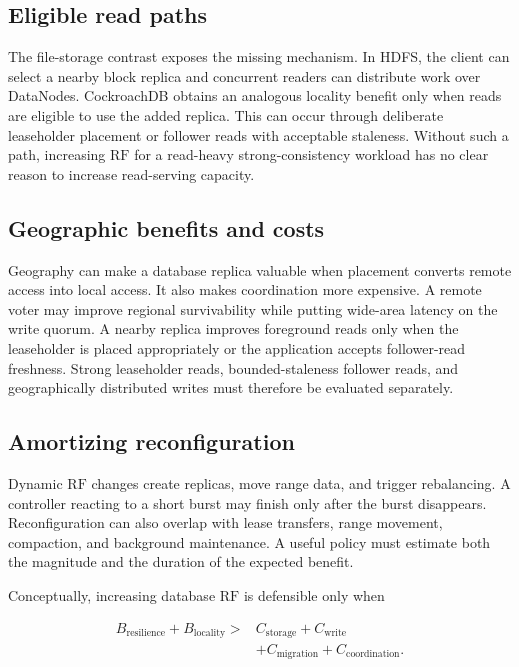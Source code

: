 \documentclass[a4paper,10pt,twocolumn]{article}
\newcommand{\rf}{\ensuremath{\mathrm{RF}}}
\newcommand{\cockroach}{CockroachDB}
\newcommand{\hdfs}{HDFS}
\begin{document}
\subsection{Eligible read paths}

The file-storage contrast exposes the missing mechanism. In \hdfs{}, the
client can select a nearby block replica and concurrent readers can distribute
work over DataNodes. \cockroach{} obtains an analogous locality benefit only
when reads are eligible to use the added replica. This can occur through
deliberate leaseholder placement or follower reads with acceptable staleness.
Without such a path, increasing \rf{} for a read-heavy strong-consistency
workload has no clear reason to increase read-serving capacity.

\subsection{Geographic benefits and costs}

Geography can make a database replica valuable when placement converts remote
access into local access. It also makes coordination more expensive. A remote
voter may improve regional survivability while putting wide-area latency on
the write quorum. A nearby replica improves foreground reads only when the
leaseholder is placed appropriately or the application accepts follower-read
freshness. Strong leaseholder reads, bounded-staleness follower reads, and
geographically distributed writes must therefore be evaluated separately.

\subsection{Amortizing reconfiguration}

Dynamic \rf{} changes create replicas, move range data, and trigger
rebalancing. A controller reacting to a short burst may finish only after the
burst disappears. Reconfiguration can also overlap with lease transfers,
range movement, compaction, and background maintenance. A useful policy must
estimate both the magnitude and the duration of the expected benefit.

Conceptually, increasing database \rf{} is defensible only when

\begin{equation}
\label{eq:decision}
\begin{aligned}
B_{\mathrm{resilience}} + B_{\mathrm{locality}}
> {} & C_{\mathrm{storage}} + C_{\mathrm{write}} \\
     & + C_{\mathrm{migration}} + C_{\mathrm{coordination}} .
\end{aligned}
\end{equation}
\end{document}
